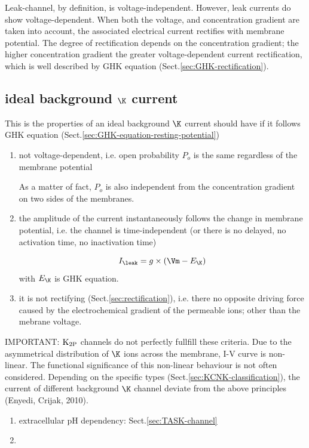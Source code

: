 Leak-channel, by definition, is voltage-independent. However, leak currents do
show voltage-dependent. When both the voltage, and concentration gradient are
taken into account, the associated electrical current rectifies with membrane
potential. The degree of rectification depends on the concentration gradient;
the higher concentration gradient the greater voltage-dependent current
rectification, which is well described by GHK equation
(Sect.\ref{sec:GHK-rectification}).

\subsection{ideal background $\K$ current}
\label{sec:leak-K+-current-ideal}

This is the properties of an ideal background $\K$ current should have if it
follows GHK equation (Sect.\ref{sec:GHK-equation-resting-potential})
\begin{enumerate}
  \item not voltage-dependent, i.e. open probability $P_o$ is the same
  regardless of the membrane potential
  
  As a matter of fact, $P_o$ is also independent from the concentration gradient
  on two sides of the membranes.
  
  \item the amplitude of the current instantaneously follows the change in
  membrane potential, i.e. the channel is time-independent (or there is no
  delayed, no activation time, no inactivation time)
  
  \begin{equation}
  I_\leak = g \times (\Vm - E_\K)
  \end{equation}
  with $E_\K$ is GHK equation.
  
  \item it is not rectifying (Sect.\ref{sec:rectification}), i.e. there no
  opposite driving force caused by the electrochemical gradient of the permeable
  ions; other than the mebrane voltage.
 
\end{enumerate}

IMPORTANT: ${\text{K}_{\text{2P}}}$ channels do not perfectly fullfill these criteria.
Due to the asymmetrical distribution of $\K$ ions across the membrane, I-V curve
is non-linear. The functional significance of this non-linear behaviour is not
often considered. Depending on the specific types
(Sect.\ref{sec:KCNK-classification}), the current of different background $\K$
channel deviate from the above principles (Enyedi, Crijak, 2010).
\begin{enumerate}
  \item extracellular pH dependency: Sect.\ref{sec:TASK-channel}
  
  \item 
\end{enumerate}


